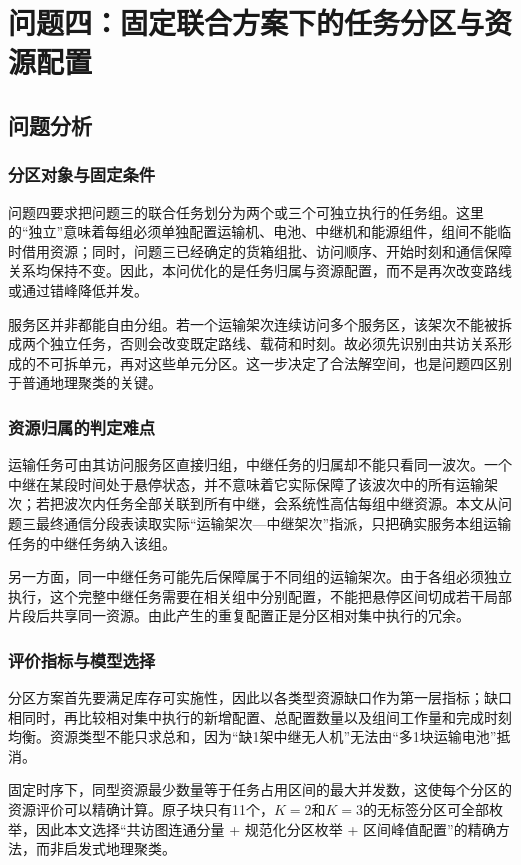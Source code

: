 \section{问题四：固定联合方案下的任务分区与资源配置}
\subsection{问题分析}
\subsubsection{分区对象与固定条件}
问题四要求把问题三的联合任务划分为两个或三个可独立执行的任务组。这里的“独立”意味着每组必须单独配置运输机、电池、中继机和能源组件，组间不能临时借用资源；同时，问题三已经确定的货箱组批、访问顺序、开始时刻和通信保障关系均保持不变。因此，本问优化的是任务归属与资源配置，而不是再次改变路线或通过错峰降低并发。

服务区并非都能自由分组。若一个运输架次连续访问多个服务区，该架次不能被拆成两个独立任务，否则会改变既定路线、载荷和时刻。故必须先识别由共访关系形成的不可拆单元，再对这些单元分区。这一步决定了合法解空间，也是问题四区别于普通地理聚类的关键。

\subsubsection{资源归属的判定难点}
运输任务可由其访问服务区直接归组，中继任务的归属却不能只看同一波次。一个中继在某段时间处于悬停状态，并不意味着它实际保障了该波次中的所有运输架次；若把波次内任务全部关联到所有中继，会系统性高估每组中继资源。本文从问题三最终通信分段表读取实际“运输架次—中继架次”指派，只把确实服务本组运输任务的中继任务纳入该组。

另一方面，同一中继任务可能先后保障属于不同组的运输架次。由于各组必须独立执行，这个完整中继任务需要在相关组中分别配置，不能把悬停区间切成若干局部片段后共享同一资源。由此产生的重复配置正是分区相对集中执行的冗余。

\subsubsection{评价指标与模型选择}
分区方案首先要满足库存可实施性，因此以各类型资源缺口作为第一层指标；缺口相同时，再比较相对集中执行的新增配置、总配置数量以及组间工作量和完成时刻均衡。资源类型不能只求总和，因为“缺1架中继无人机”无法由“多1块运输电池”抵消。

固定时序下，同型资源最少数量等于任务占用区间的最大并发数，这使每个分区的资源评价可以精确计算。原子块只有11个，$K=2$和$K=3$的无标签分区可全部枚举，因此本文选择“共访图连通分量 + 规范化分区枚举 + 区间峰值配置”的精确方法，而非启发式地理聚类。

